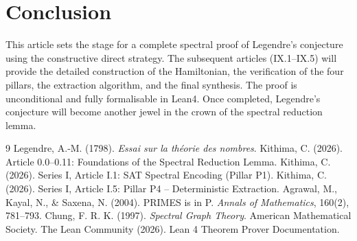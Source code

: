 \documentclass[11pt,a4paper]{article}
\begin{document}
\section{Conclusion}

This article sets the stage for a complete spectral proof of Legendre's conjecture using the constructive direct strategy. The subsequent articles (IX.1–IX.5) will provide the detailed construction of the Hamiltonian, the verification of the four pillars, the extraction algorithm, and the final synthesis. The proof is unconditional and fully formalisable in Lean4. Once completed, Legendre's conjecture will become another jewel in the crown of the spectral reduction lemma.


\begin{thebibliography}{9}
  Legendre, A.‑M. (1798). \emph{Essai sur la théorie des nombres}.
  Kithima, C. (2026). Article 0.0–0.11: Foundations of the Spectral Reduction Lemma.
  Kithima, C. (2026). Series I, Article I.1: SAT Spectral Encoding (Pillar P1).
  Kithima, C. (2026). Series I, Article I.5: Pillar P4 – Deterministic Extraction.
  Agrawal, M., Kayal, N., \& Saxena, N. (2004). PRIMES is in P. \emph{Annals of Mathematics}, 160(2), 781–793.
  Chung, F. R. K. (1997). \emph{Spectral Graph Theory}. American Mathematical Society.
  The Lean Community (2026). Lean 4 Theorem Prover Documentation.
\end{thebibliography}
\end{document}
